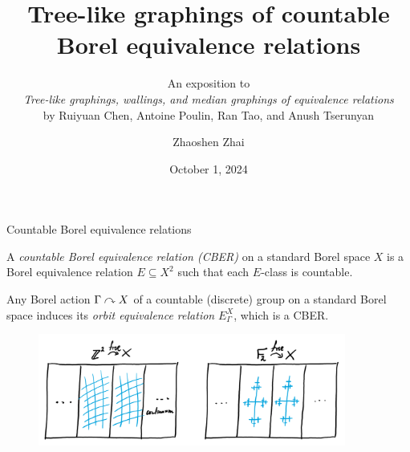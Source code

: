\documentclass{beamer}
\title{\normalsize{Tree-like graphings of countable Borel equivalence relations}}
\subtitle{\scriptsize{An exposition to\\\textit{Tree-like graphings, wallings, and median graphings of equivalence relations}\\by Ruiyuan Chen, Antoine Poulin, Ran Tao, and Anush Tserunyan}}
\author{\small Zhaoshen Zhai}
\date{\footnotesize October 1, 2024}
\institute{McGill University}
\begin{document}
\frame{\titlepage}
    \begin{frame}{Countable Borel equivalence relations}
        \begin{definition}
            A \textit{countable Borel equivalence relation (CBER)} on a standard Borel space $X$ is a Borel equivalence relation $E\subseteq X^2$ such that each $E$-class is countable.
        \end{definition}

        \pause
        \vspace{-0.1in}

        \begin{example}
            Any Borel action $\Gamma\curvearrowright X$ of a countable (discrete) group on a standard Borel space induces its \textit{orbit equivalence relation} $E^X_\Gamma$, which is a CBER.
        \end{example}

        \pause
        \vspace{-0.15in}

        \begin{figure}[h]
            \center
            \includegraphics[width=0.9\textwidth]{img/group_action.png}
        \end{figure}
    \end{frame}
\end{document}
